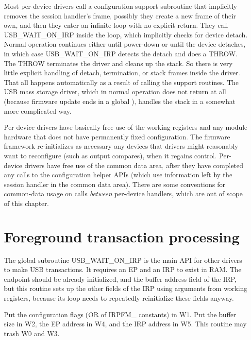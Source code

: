 Most per-device drivers call a configuration support subroutine that
implicitly removes the session handler's  frame, possibly they
create a new frame of their own, and then they enter an infinite loop with
no explicit return.  They call USB\_WAIT\_ON\_IRP inside the loop, which
implicitly checks for device detach.  Normal operation continues either
until power-down or until the device detaches, in which case
USB\_WAIT\_ON\_IRP detects the detach and does a THROW.  The THROW
terminates the driver and cleans up the stack.  So there is very little
explicit handling of detach, termination, or stack frames inside the driver. 
That all happens automatically as a result of calling the support routines. 
The USB mass storage driver, which in normal operation does not return at
all (because firmware update ends in a global ), handles the
stack in a somewhat more complicated way.

Per-device drivers have basically free use of the working registers and any
module hardware that does not have permanently fixed configuration.  The
firmware framework re-initializes as necessary any devices that drivers
might reasonably want to reconfigure (such as output compares), when it
regains control.  Per-device drivers have free use of the common data area,
after they have completed any calls to the configuration helper APIs (which
use information left by the session handler in the common data area).  There
are some conventions for common-data usage on calls \emph{between}
per-device handlers, which are out of scope of this chapter.

\section{Foreground transaction processing}

The global subroutine USB\_WAIT\_ON\_IRP is the main API for other drivers
to make USB transactions.  It requires an EP and an IRP to exist in RAM. 
The endpoint should be already initialized, and the buffer address field of
the IRP, but this routine sets up the other fields of the IRP using
arguments from working registers, because its loop needs to repeatedly
reinitialize these fields anyway.
 
Put the configuration flags (OR of IRPFM\_ constants) in W1.  Put the buffer
size in W2, the EP address in W4, and the IRP address in W5.  This routine
may trash W0 and W3.


